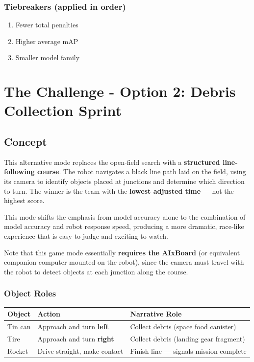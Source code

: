 \documentclass[11pt,a4paper]{article}
\begin{document}
\subsubsection*{Tiebreakers (applied in order)}

\begin{enumerate}
    \item Fewer total penalties
    \item Higher average mAP
    \item Smaller model family
\end{enumerate}

\section{The Challenge - Option 2: Debris Collection Sprint}

\subsection{Concept}

This alternative mode replaces the open-field search with a \textbf{structured line-following course}. The robot navigates a black line path laid on the field, using its camera to identify objects placed at junctions and determine which direction to turn. The winner is the team with the \textbf{lowest adjusted time} — not the highest score.

This mode shifts the emphasis from model accuracy alone to the combination of model accuracy and robot response speed, producing a more dramatic, race-like experience that is easy to judge and exciting to watch.

Note that this game mode essentially \textbf{requires the AIxBoard} (or equivalent companion computer mounted on the robot), since the camera must travel with the robot to detect objects at each junction along the course.

\subsubsection*{Object Roles}

\begin{center}
\begin{tabular}{|l|l|l|}
\hline
\textbf{Object} & \textbf{Action} & \textbf{Narrative Role} \\
\hline
Tin can  & Approach and turn \textbf{left}   & Collect debris (space food canister) \\
Tire     & Approach and turn \textbf{right}  & Collect debris (landing gear fragment) \\
Rocket   & Drive straight, make contact      & Finish line — signals mission complete \\
\hline
\end{tabular}
\end{center}
\end{document}
